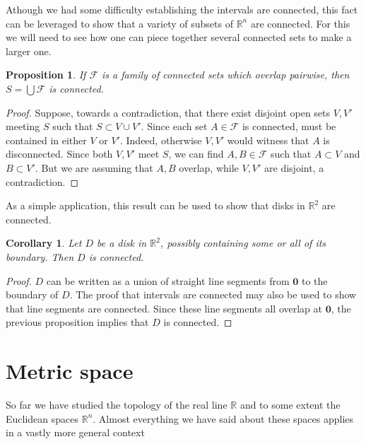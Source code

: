 \documentclass[11pt,oneside]{amsbook}
\newcommand{\RR}{\mathbb R}
\theoremstyle{definition}
\theoremstyle{plain}
\newtheorem{cor}[thm]{Corollary}
\newtheorem{prop}[thm]{Proposition}
\theoremstyle{definition}
\theoremstyle{remark}
\numberwithin{equation}{section}
\numberwithin{figure}{section}
\begin{document}
Athough we had some difficulty establishing the intervals are connected, this fact can be leveraged to show that a variety of subsets of $\RR^n$ are connected. For this we will need to see how one can piece together several connected sets to make a larger one.

\begin{prop}
  If $\mathcal F$ is a family of connected sets which overlap pairwise, then $S=\bigcup\mathcal F$ is connected.
\end{prop}

\begin{proof}
  Suppose, towards a contradiction, that there exist disjoint open sets $V,V'$ meeting $S$ such that $S\subset V\cup V'$. Since each set $A\in\mathcal F$ is connected, must be contained in either $V$ or $V'$. Indeed, otherwise $V,V'$ would witness that $A$ is disconnected. Since both $V,V'$ meet $S$, we can find $A,B\in\mathcal F$ such that $A\subset V$ and $B\subset V'$. But we are assuming that $A,B$ overlap, while $V,V'$ are disjoint, a contradiction.
\end{proof}

As a simple application, this result can be used to show that disks in $\RR^2$ are connected.

\begin{cor}
  Let $D$ be a disk in $\RR^2$, possibly containing some or all of its boundary. Then $D$ is connected.
\end{cor}

\begin{proof}
  $D$ can be written as a union of straight line segments from $\mathbf{0}$ to the boundary of $D$. The proof that intervals are connected may also be used to show that line segments are connected. Since these line segments all overlap at $\mathbf{0}$, the previous proposition implies that $D$ is connected.
\end{proof}


\newpage
\section{Metric space}

So far we have studied the topology of the real line $\RR$ and to some extent the Euclidean spaces $\RR^n$. Almost everything we have said about these spaces applies in a vastly more general context
\end{document}
